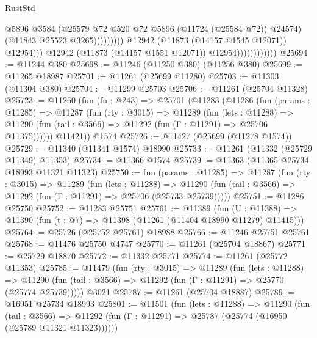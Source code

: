 \begin{lexlean}{RustStd}
\begin{coremodule}
                                                  @5896
                                                  @3584
                                                  (@25579
                                                    @72
                                                    @520
                                                    @72
                                                    @5896
                                                    (@11724 (@25584 @72))
                                                    @24574)
                                                  (@11843 @25523 @3265)))))))))
                                  @12942
                                  (@11873 (@14157 @1545 @12071))
                                  @12954)))
                            @12942
                            (@11873 (@14157 @1551 @12071))
                            @12954))))))))))))
@25694 := @11244 @380
@25698 := @11246 (@11250 @380) (@11256 @380)
@25699 := @11265 @18987
@25701 := @11261 (@25699 @11280)
@25703 := @11303 (@11304 @380)
@25704 := @11299 @25703
@25706 := @11261 (@25704 @11328)
@25723 := @11260
    (fun (fn : @243) =>
    @25701
      (@11283
        (@11286
          (fun (params : @11285) =>
          @11287
            (fun (rty : @3015) =>
            @11289
              (fun (lets : @11288) =>
              @11290 (fun (tail : @3566) => @11292 (fun (Γ : @11291) => @25706 @11375))))))
        @11421))
    @1574
@25726 := @11427 (@25699 (@11278 @1574))
@25729 := @11340 (@11341 @1574) @18990
@25733 := @11261 (@11332 (@25729 @11349) @11353)
@25734 := @11366 @1574
@25739 := @11363 (@11365 @25734 @18993 @11321 @11323)
@25750 := fun (params : @11285) =>
  @11287
    (fun (rty : @3015) =>
    @11289
      (fun (lets : @11288) =>
      @11290 (fun (tail : @3566) => @11292 (fun (Γ : @11291) => @25706 (@25733 @25739)))))
@25751 := @11286 @25750
@25752 := @11283 @25751
@25761 := @11389
    (fun (U : @11388) => @11390 (fun (t : @7) => @11398 (@11261 (@11404 @18990 @11279) @11415)))
@25764 := @25726 (@25752 @25761) @18988
@25766 := @11246 @25751 @25761
@25768 := @11476 @25750 @4747
@25770 := @11261 (@25704 @18867)
@25771 := @25729 @18870
@25772 := @11332 @25771
@25774 := @11261 (@25772 @11353)
@25785 := @11479
    (fun (rty : @3015) =>
    @11289
      (fun (lets : @11288) =>
      @11290 (fun (tail : @3566) => @11292 (fun (Γ : @11291) => @25770 (@25774 @25739)))))
    @3021
@25787 := @11261 (@25704 @18887)
@25789 := @16951 @25734 @18993
@25801 := @11501
    (fun (lets : @11288) =>
    @11290
      (fun (tail : @3566) =>
      @11292 (fun (Γ : @11291) => @25787 (@25774 (@16950 (@25789 @11321 @11323))))))

\end{coremodule}
\end{lexlean}
